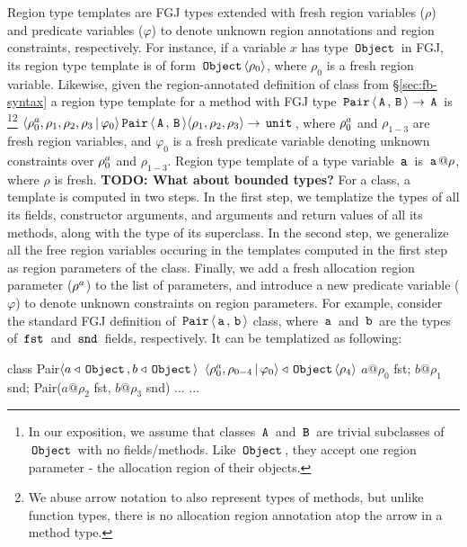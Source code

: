 Region type templates are FGJ types extended with fresh region
variables ($\rho$) and predicate variables ($\varphi$) to denote
unknown region annotations and region constraints, respectively. For
instance, if a variable $x$ has type $\,{\tt Object}\,$ in FGJ, its region type
template is of form $\,{\tt Object}\,\langle \rho_0 \rangle$, where $\rho_0$ is a fresh
region variable. Likewise, given the region-annotated definition of
 class from \S\ref{sec:fb-syntax} a region type template for a
method with FGJ type $\,{\tt Pair}\,\langle \,{\tt A}\,,\,{\tt B}\, \rangle \rightarrow \,{\tt A}\,$
is \footnote{In our exposition, we assume that classes $\,{\tt A}\,$ and
$\,{\tt B}\,$ are trivial subclasses of $\,{\tt Object}\,$ with no fields/methods. Like
$\,{\tt Object}\,$, they accept one region parameter - the allocation region of
their objects.}\footnote{We abuse arrow notation to also represent
types of methods, but unlike function types, there is no allocation
region annotation atop the arrow in a method type.}
$\langle \rho^a_0,\rho_1,\rho_2,\rho_3 \,|\, \varphi_0 \rangle
\,{\tt Pair}\,\langle \,{\tt A}\,,\,{\tt B}\, \rangle \langle \rho_1,\rho_2,\rho_3 \rangle \rightarrow
\,{\tt unit}\,$, where $\rho^a_0$ and $\rho_{1-3}$ are fresh region
variables, and $\varphi_0$ is a fresh predicate variable denoting
unknown constraints over $\rho^a_0$ and $\rho_{1-3}$.  Region type
template of a type variable $\,{\tt a}\,$ is $\,{\tt a}\,@\rho$, where $\rho$ is
fresh.
\textbf{TODO: What about bounded types?}
For a class, a template is computed in two steps. In the first
step, we templatize the types of all its fields, constructor
arguments, and arguments and return values of all its methods, along
with the type of its superclass. In the second step, we generalize all
the free region variables occuring in the templates computed in the
first step as region parameters of the class. Finally, we add a fresh
allocation region parameter ($\rho^a$) to the list of parameters,
and introduce a new predicate variable ($\varphi$) to denote unknown
constraints on region parameters. For example, consider the standard
FGJ definition of $\,{\tt Pair}\,\langle \,{\tt a}\,,\,{\tt b}\, \rangle$ class, where $\,{\tt a}\,$
and $\,{\tt b}\,$ are the types of $\,{\tt fst}\,$ and $\,{\tt snd}\,$ fields,
respectively. It can be templatized as following:
\begin{center}
\begin{codejava}
class Pair$\langle a\triangleleft\,{\tt Object}\,, b\triangleleft\,{\tt Object}\, \rangle$
          $\langle \rho^a_0,\rho_{0-4}\,|\,\varphi_0 \rangle \triangleleft \,{\tt Object}\,\langle \rho_4 \rangle$ {
  $a@\rho_0$ fst;
  $b@\rho_1$ snd;
  Pair($a@\rho_2$ fst, $b@\rho_3$ snd) { $...$ }
  $...$
}
\end{codejava}
\end{center}
